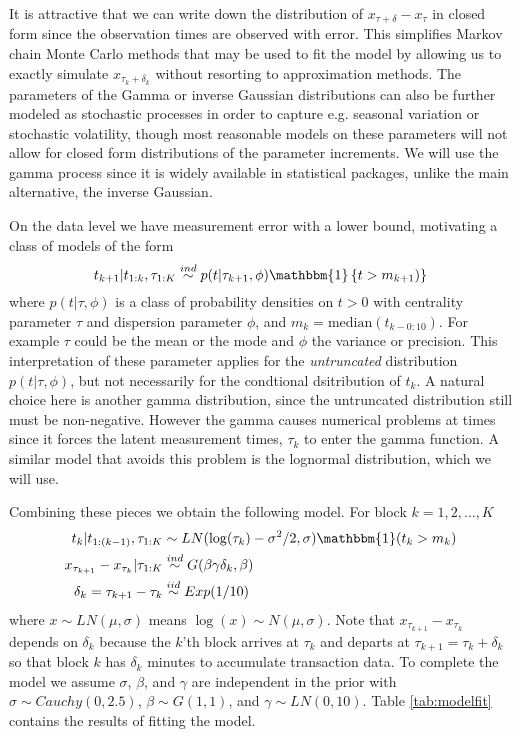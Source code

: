 \documentclass{article}
\begin{document}
It is attractive that we can write down the distribution of $x_{\tau + \delta} - x_\tau$ in closed form since the observation times are observed with error. This simplifies Markov chain Monte Carlo methods that may be used to fit the model by allowing us to exactly simulate $x_{\tau_k + \delta_k}$ without resorting to approximation methods. The parameters of the Gamma or inverse Gaussian distributions can also be further modeled as stochastic processes in order to capture e.g. seasonal variation or stochastic volatility, though most reasonable models on these parameters will not allow for closed form distributions of the parameter increments. We will use the gamma process since it is widely available in statistical packages, unlike the main alternative, the inverse Gaussian.

On the data level we have measurement error with a lower bound, motivating a class of models of the form 
\[
t_{k+1} |t_{1:k}, \tau_{1:K} \stackrel{ind}{\sim} p(t|\tau_{k+1}, \phi)\mathbbm{1}\left\{t > m_{k+1})\right\}
\]
where $p(t|\tau,\phi)$ is a class of probability densities on $t>0$ with centrality parameter $\tau$ and dispersion parameter $\phi$, and $m_k = \mathrm{median}(t_{k - 0:10})$. For example $\tau$ could be the mean or the mode and $\phi$ the variance or precision. This interpretation of these parameter applies for the {\it untruncated} distribution $p(t|\tau,\phi)$, but not necessarily for the condtional dsitribution of $t_k$. A natural choice here is another gamma distribution, since the untruncated distribution still must be non-negative. However the gamma causes numerical problems at times since it forces the latent measurement times, $\tau_k$ to enter the gamma function. A similar model that avoids this problem is the lognormal distribution, which we will use.

Combining these pieces we obtain the following model. For block $k=1,2,\dots,K$
\begin{align*}
t_k|t_{1:(k-1)}, \tau_{1:K} &\sim LN(\log(\tau_k) - \sigma^2/2, \sigma)\mathbbm{1}(t_k > m_k)\\
x_{\tau_{k+1}} - x_{\tau_{k}}|\tau_{1:K} & \stackrel{ind}{\sim} G(\beta\gamma\delta_k,\beta)\\
\delta_{k} = \tau_{k+1} - \tau_{k} &\stackrel{iid}{\sim} Exp(1/10)
\end{align*}
where $x\sim LN(\mu,\sigma)$ means $\log(x) \sim N(\mu,\sigma)$. Note that $x_{\tau_{k+1}} - x_{\tau_k}$ depends on $\delta_k$ because the $k$'th block arrives at $\tau_k$ and departs at $\tau_{k+1}=\tau_k + \delta_k$ so that block $k$ has $\delta_k$ minutes to accumulate transaction data. To complete the model we assume $\sigma$, $\beta$, and $\gamma$ are independent in the prior with $\sigma \sim Cauchy(0, 2.5)$, $\beta \sim G(1, 1)$, and $\gamma \sim LN(0, 10)$. Table \ref{tab:modelfit} contains the results of fitting the model.
\end{document}
